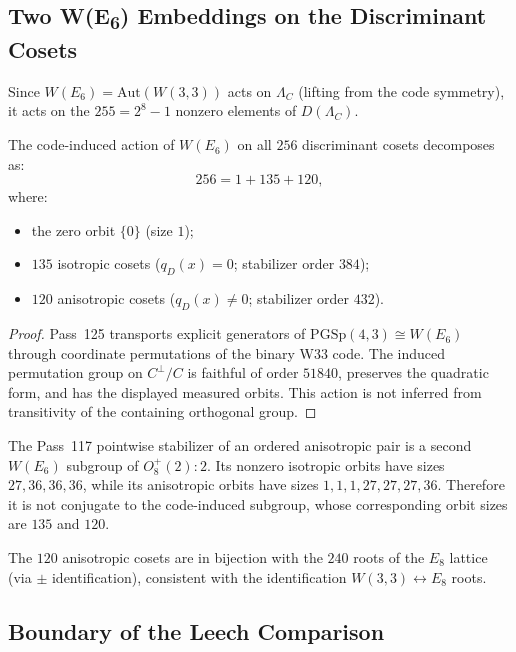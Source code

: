 \subsection{Two W(E\textsubscript{6}) Embeddings on the Discriminant Cosets}

Since $W(E_6) = \mathrm{Aut}(W(3,3))$ acts on $\Lambda_C$ (lifting from the code symmetry),
it acts on the $255 = 2^8 - 1$ nonzero elements of $D(\Lambda_C)$.

\begin{theorem}
\label{thm:orbits}
The code-induced action of $W(E_6)$ on all $256$ discriminant cosets
decomposes as:
$$256 = 1 + 135 + 120,$$
where:
\begin{itemize}
\item the zero orbit $\{0\}$ (size $1$);
\item $135$ isotropic cosets ($q_D(x) = 0$; stabilizer order $384$);
\item $120$ anisotropic cosets ($q_D(x) \neq 0$; stabilizer order $432$).
\end{itemize}
\end{theorem}

\begin{proof}
Pass~125 transports explicit generators of
$\mathrm{PGSp}(4,3)\cong W(E_6)$ through coordinate permutations of the
binary W33 code. The induced permutation group on $C^\perp/C$ is faithful of
order $51840$, preserves the quadratic form, and has the displayed measured
orbits. This action is not inferred from transitivity of the containing
orthogonal group.
\end{proof}

\begin{theorem}
The Pass~117 pointwise stabilizer of an ordered anisotropic pair is a second
$W(E_6)$ subgroup of $O_8^+(2):2$. Its nonzero isotropic orbits have sizes
$27,36,36,36$, while its anisotropic orbits have sizes
$1,1,1,27,27,27,36$. Therefore it is not conjugate to the code-induced
subgroup, whose corresponding orbit sizes are $135$ and $120$.
\end{theorem}

\begin{corollary}
\label{cor:roots}
The $120$ anisotropic cosets are in bijection with the $240$ roots of the $E_8$ lattice
(via $\pm$ identification), consistent with the identification $W(3,3) \leftrightarrow E_8$ roots.
\end{corollary}

\subsection{Boundary of the Leech Comparison}

